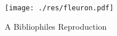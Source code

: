 \begin{titlepage}
    \begin{center}
        \large

        \hfill

        \vfill

        \begingroup
            \color{Maroon} \\ \bigskip
        \endgroup

         \\
        
        \vfill
        
        \texttt{[image: ./res/fleuron.pdf]}
        
        \vfill


        A Bibliophiles Reproduction \\ \medskip

        \myTime
        

        \vfill                      

    \end{center}  
\end{titlepage}   